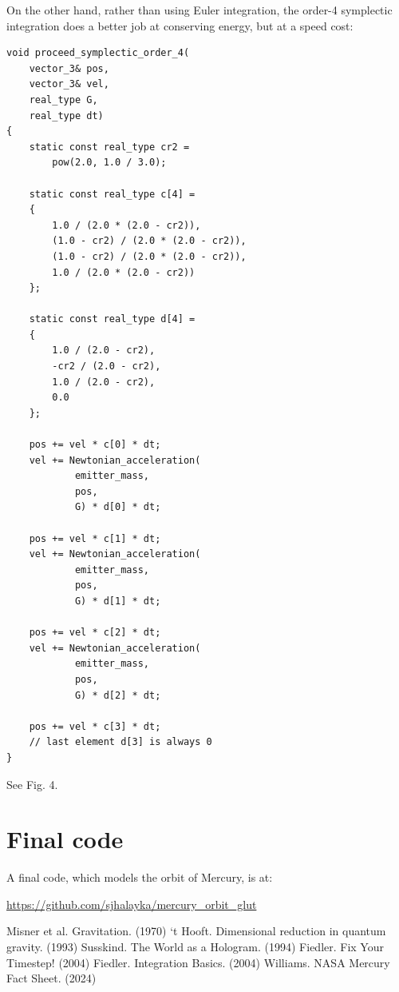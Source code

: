 \documentclass[12pt]{article}
\begin{document}
On the other hand, rather than using Euler integration, the order-4 symplectic integration does a better job at conserving energy, but at a speed cost:
\begin{lstlisting}
void proceed_symplectic_order_4(
	vector_3& pos, 
	vector_3& vel, 
	real_type G, 
	real_type dt)
{
	static const real_type cr2 = 
		pow(2.0, 1.0 / 3.0);

	static const real_type c[4] =
	{
		1.0 / (2.0 * (2.0 - cr2)),
		(1.0 - cr2) / (2.0 * (2.0 - cr2)),
		(1.0 - cr2) / (2.0 * (2.0 - cr2)),
		1.0 / (2.0 * (2.0 - cr2))
	};

	static const real_type d[4] =
	{
		1.0 / (2.0 - cr2),
		-cr2 / (2.0 - cr2),
		1.0 / (2.0 - cr2),
		0.0
	};

	pos += vel * c[0] * dt;
	vel += Newtonian_acceleration(
			emitter_mass, 
			pos, 
			G) * d[0] * dt;

	pos += vel * c[1] * dt;
	vel += Newtonian_acceleration(
			emitter_mass, 
			pos, 
			G) * d[1] * dt;

	pos += vel * c[2] * dt;
	vel += Newtonian_acceleration(
			emitter_mass, 
			pos, 
			G) * d[2] * dt;

	pos += vel * c[3] * dt;
	// last element d[3] is always 0
}
\end{lstlisting}

See Fig. 4.







\section{Final code}

A final code, which models the orbit of Mercury, is at:

\url{https://github.com/sjhalayka/mercury_orbit_glut}





\pagebreak






\begin{thebibliography}{9}

 Misner et al. Gravitation. (1970)
 `t Hooft. Dimensional reduction in quantum gravity. (1993)
 Susskind. The World as a Hologram. (1994)
 Fiedler. Fix Your Timestep! (2004)
 Fiedler. Integration Basics. (2004)
 Williams. NASA Mercury Fact Sheet. (2024)

\end{thebibliography}
\end{document}
